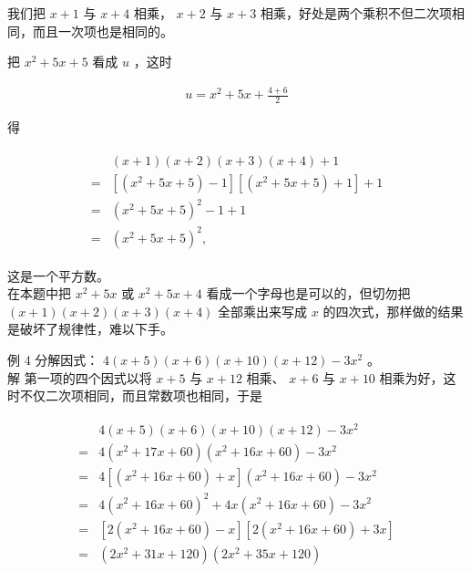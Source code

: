 \documentclass[10pt]{article}
\begin{document}
我们把 $x+1$ 与 $x+4$ 相乘， $x+2$ 与 $x+3$ 相乘，好处是两个乘积不但二次项相同，而且一次项也是相同的。

把 $x^{2}+5 x+5$ 看成 $u$ ，这时

\begin{align*}
u=x^{2}+5 x+\frac{4+6}{2}
\end{align*}

得

\begin{align*}
\begin{aligned}
& (x+1)(x+2)(x+3)(x+4)+1 \\
= & {\left[\left(x^{2}+5 x+5\right)-1\right]\left[\left(x^{2}+5 x+5\right)+1\right]+1 } \\
= & \left(x^{2}+5 x+5\right)^{2}-1+1 \\
= & \left(x^{2}+5 x+5\right)^{2},
\end{aligned}
\end{align*}

这是一个平方数。\\
在本题中把 $x^{2}+5 x$ 或 $x^{2}+5 x+4$ 看成一个字母也是可以的，但切勿把 $(x+1)(x+2)(x+3)(x+4)$ 全部乘出来写成 $x$ 的四次式，那样做的结果是破坏了规律性，难以下手。

例 4 分解因式： $4(x+5)(x+6)(x+10)(x+12)-3 x^{2}$ 。\\
解 第一项的四个因式以将 $x+5$ 与 $x+12$ 相乘、 $x+6$ 与 $x+10$ 相乘为好，这时不仅二次项相同，而且常数项也相同，于是

\begin{align*}
\begin{aligned}
& 4(x+5)(x+6)(x+10)(x+12)-3 x^{2} \\
= & 4\left(x^{2}+17 x+60\right)\left(x^{2}+16 x+60\right)-3 x^{2} \\
= & 4\left[\left(x^{2}+16 x+60\right)+x\right]\left(x^{2}+16 x+60\right)-3 x^{2} \\
= & 4\left(x^{2}+16 x+60\right)^{2}+4 x\left(x^{2}+16 x+60\right)-3 x^{2} \\
= & {\left[2\left(x^{2}+16 x+60\right)-x\right]\left[2\left(x^{2}+16 x+60\right)+3 x\right] } \\
= & \left(2 x^{2}+31 x+120\right)\left(2 x^{2}+35 x+120\right)
\end{aligned}
\end{align*}
\end{document}
